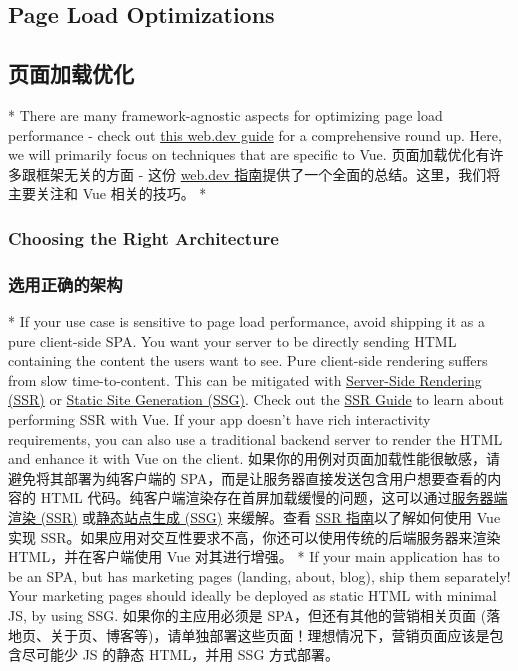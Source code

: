 \begin{paracol}{2}
\subsection{Page Load Optimizations}
\switchcolumn
\subsection{页面加载优化}
\switchcolumn[0]*%
There are many framework-agnostic aspects for optimizing page load
performance - check out \href{https://web.dev/fast/}{this web.dev guide}
for a comprehensive round up. Here, we will primarily focus on
techniques that are specific to Vue.
\switchcolumn
页面加载优化有许多跟框架无关的方面 - 这份
\href{https://web.dev/fast/}{web.dev
指南}提供了一个全面的总结。这里，我们将主要关注和 Vue 相关的技巧。
\switchcolumn[0]*%
\subsubsection{Choosing the Right Architecture}
\switchcolumn
\subsubsection{选用正确的架构}
\switchcolumn[0]*%
If your use case is sensitive to page load performance, avoid shipping
it as a pure client-side SPA. You want your server to be directly
sending HTML containing the content the users want to see. Pure
client-side rendering suffers from slow time-to-content. This can be
mitigated with
\href{https://vuejs.org/guide/extras/ways-of-using-vue.html\#fullstack-ssr}{Server-Side
Rendering (SSR)} or
\href{https://vuejs.org/guide/extras/ways-of-using-vue.html\#jamstack-ssg}{Static
Site Generation (SSG)}. Check out the
\href{https://vuejs.org/guide/scaling-up/ssr.html}{SSR Guide} to learn
about performing SSR with Vue. If your app doesn't have rich
interactivity requirements, you can also use a traditional backend
server to render the HTML and enhance it with Vue on the client.
\switchcolumn
如果你的用例对页面加载性能很敏感，请避免将其部署为纯客户端的
SPA，而是让服务器直接发送包含用户想要查看的内容的 HTML
代码。纯客户端渲染存在首屏加载缓慢的问题，这可以通过\href{https://cn.vuejs.org/guide/extras/ways-of-using-vue.html\#fullstack-ssr}{服务器端渲染
(SSR)}
或\href{https://cn.vuejs.org/guide/extras/ways-of-using-vue.html\#jamstack-ssg}{静态站点生成
(SSG)} 来缓解。查看
\href{https://cn.vuejs.org/guide/scaling-up/ssr.html}{SSR
指南}以了解如何使用 Vue 实现
SSR。如果应用对交互性要求不高，你还可以使用传统的后端服务器来渲染
HTML，并在客户端使用 Vue 对其进行增强。
\switchcolumn[0]*%
If your main application has to be an SPA, but has marketing pages
(landing, about, blog), ship them separately! Your marketing pages
should ideally be deployed as static HTML with minimal JS, by using SSG.
\switchcolumn
如果你的主应用必须是 SPA，但还有其他的营销相关页面
(落地页、关于页、博客等)，请单独部署这些页面！理想情况下，营销页面应该是包含尽可能少
JS 的静态 HTML，并用 SSG 方式部署。
\end{paracol}



